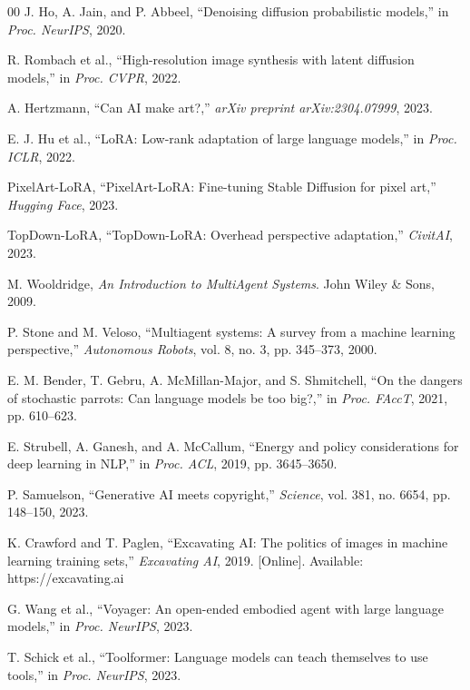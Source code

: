 \documentclass[conference]{IEEEtran}
\begin{document}
\begin{thebibliography}{00}
 J. Ho, A. Jain, and P. Abbeel, ``Denoising diffusion probabilistic models,'' in \emph{Proc. NeurIPS}, 2020.

 R. Rombach et al., ``High-resolution image synthesis with latent diffusion models,'' in \emph{Proc. CVPR}, 2022.

 A. Hertzmann, ``Can AI make art?,'' \emph{arXiv preprint arXiv:2304.07999}, 2023.

 E. J. Hu et al., ``LoRA: Low-rank adaptation of large language models,'' in \emph{Proc. ICLR}, 2022.

 PixelArt-LoRA, ``PixelArt-LoRA: Fine-tuning Stable Diffusion for pixel art,'' \emph{Hugging Face}, 2023.

 TopDown-LoRA, ``TopDown-LoRA: Overhead perspective adaptation,'' \emph{CivitAI}, 2023.

 M. Wooldridge, \emph{An Introduction to MultiAgent Systems}. John Wiley \& Sons, 2009.

 P. Stone and M. Veloso, ``Multiagent systems: A survey from a machine learning perspective,'' \emph{Autonomous Robots}, vol. 8, no. 3, pp. 345--373, 2000.

 E. M. Bender, T. Gebru, A. McMillan-Major, and S. Shmitchell, ``On the dangers of stochastic parrots: Can language models be too big?,'' in \emph{Proc. FAccT}, 2021, pp. 610--623.

 E. Strubell, A. Ganesh, and A. McCallum, ``Energy and policy considerations for deep learning in NLP,'' in \emph{Proc. ACL}, 2019, pp. 3645--3650.

 P. Samuelson, ``Generative AI meets copyright,'' \emph{Science}, vol. 381, no. 6654, pp. 148--150, 2023.

 K. Crawford and T. Paglen, ``Excavating AI: The politics of images in machine learning training sets,'' \emph{Excavating AI}, 2019. [Online]. Available: https://excavating.ai

 G. Wang et al., ``Voyager: An open-ended embodied agent with large language models,'' in \emph{Proc. NeurIPS}, 2023.

 T. Schick et al., ``Toolformer: Language models can teach themselves to use tools,'' in \emph{Proc. NeurIPS}, 2023.


\end{thebibliography}
\end{document}

